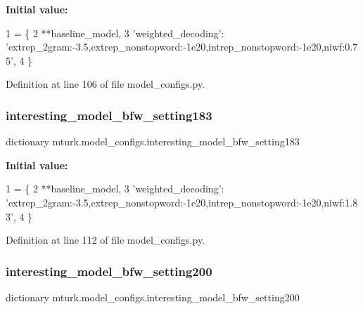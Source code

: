 {\bfseries Initial value\+:}
\begin{DoxyCode}
1 =  \{
2     **baseline\_model,
3     \textcolor{stringliteral}{'weighted\_decoding'}: \textcolor{stringliteral}{'extrep\_2gram:-3.5,extrep\_nonstopword:-1e20,intrep\_nonstopword:-1e20,niwf:0.75'},
4 \}
\end{DoxyCode}


Definition at line 106 of file model\+\_\+configs.\+py.

\mbox{\label{namespacemturk_1_1model__configs_aabea7333853a191c182b26392d65823f}} 
\subsubsection{\texorpdfstring{interesting\+\_\+model\+\_\+bfw\+\_\+setting183}{interesting\_model\_bfw\_setting183}}
{\footnotesize\ttfamily dictionary mturk.\+model\+\_\+configs.\+interesting\+\_\+model\+\_\+bfw\+\_\+setting183}

{\bfseries Initial value\+:}
\begin{DoxyCode}
1 =  \{
2     **baseline\_model,
3     \textcolor{stringliteral}{'weighted\_decoding'}: \textcolor{stringliteral}{'extrep\_2gram:-3.5,extrep\_nonstopword:-1e20,intrep\_nonstopword:-1e20,niwf:1.83'},
4 \}
\end{DoxyCode}


Definition at line 112 of file model\+\_\+configs.\+py.

\mbox{\label{namespacemturk_1_1model__configs_ad451f7692fd4249be401a7217b7d5edb}} 
\subsubsection{\texorpdfstring{interesting\+\_\+model\+\_\+bfw\+\_\+setting200}{interesting\_model\_bfw\_setting200}}
{\footnotesize\ttfamily dictionary mturk.\+model\+\_\+configs.\+interesting\+\_\+model\+\_\+bfw\+\_\+setting200}

